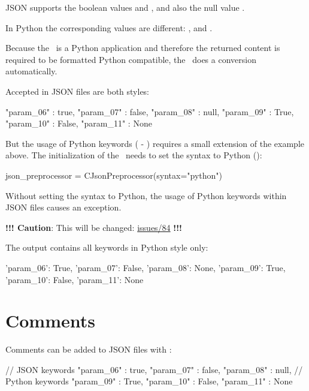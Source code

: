 JSON supports the boolean values  and , and also the null value .

In Python the corresponding values are different: ,  and .

Because the \pkg\ is a Python application and therefore the returned content is required to be formatted Python compatible,
the \pkg\ does a conversion automatically.

Accepted in JSON files are both styles:

\begin{pythoncode}
{
   "param_06" : true,
   "param_07" : false,
   "param_08" : null,
   "param_09" : True,
   "param_10" : False,
   "param_11" : None
}
\end{pythoncode}

But the usage of Python keywords ( - ) requires a small extension of the example above.
The initialization of the \pkg\ needs to set the syntax to Python ():

\begin{pythoncode}
json_preprocessor = CJsonPreprocessor(syntax="python")
\end{pythoncode}

Without setting the syntax to Python, the usage of Python keywords within JSON files causes an exception.

\textbf{!!! Caution}: This will be changed:
\href{https://github.com/test-fullautomation/python-jsonpreprocessor/issues/84}{issues/84} \textbf{!!!}

The output contains all keywords in Python style only:

\begin{pythonlog}
{'param_06': True,
 'param_07': False,
 'param_08': None,
 'param_09': True,
 'param_10': False,
 'param_11': None}
\end{pythonlog}



\newpage

\section{Comments}

Comments can be added to JSON files with \pcode{//}:

\begin{pythoncode}
{
   // JSON keywords
   "param_06" : true,
   "param_07" : false,
   "param_08" : null,
   // Python keywords
   "param_09" : True,
   "param_10" : False,
   "param_11" : None
}
\end{pythoncode}

